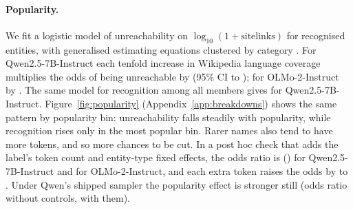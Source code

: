 \documentclass[11pt]{article}
\begin{document}
\paragraph{Popularity.} We fit a logistic model of unreachability on $\log_{10}(1+\text{sitelinks})$ for recognised entities, with generalised estimating equations clustered by category \citep{liang1986longitudinal}. For Qwen2.5-7B-Instruct each tenfold increase in Wikipedia language coverage multiplies the odds of being unreachable by \ptOrUnreachQwenInst{} (95\% CI \ptOrUnreachQwenInstLo{} to \ptOrUnreachQwenInstHi{}); for OLMo-2-Instruct by \ptOrUnreachOlmoInst{}. The same model for recognition among all members gives \ptOrRecogQwenInst{} for Qwen2.5-7B-Instruct. Figure~\ref{fig:popularity} (Appendix~\ref{app:breakdowns}) shows the same pattern by popularity bin: unreachability falls steadily with popularity, while recognition rises only in the most popular bin. Rarer names also tend to have more tokens, and so more chances to be cut. In a post hoc check that adds the label's token count and entity-type fixed effects, the odds ratio is \ctPopOrQwenControlled{} (\ctPopOrQwenControlledCI{}) for Qwen2.5-7B-Instruct and \ctPopOrOlmoControlled{} for OLMo-2-Instruct, and each extra token raises the odds by \ctLabelTokenPctMin{} to \ctLabelTokenPctMax{}. Under Qwen's shipped sampler the popularity effect is stronger still (odds ratio \ctPopOrQwenShipped{} without controls, \ctPopOrQwenShippedControlled{} with them).
\end{document}
